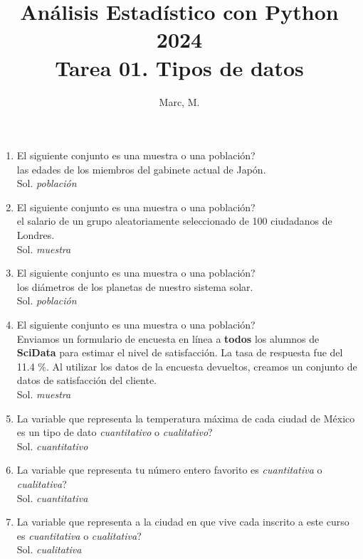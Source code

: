 \documentclass[12pt,letterpaper]{article}
\title{Análisis Estadístico con Python 2024 \\ Tarea 01. Tipos de datos}
\author{Marc, M.}
\begin{document}
\maketitle




\begin{enumerate}
  \item El siguiente conjunto es una muestra o una población? \\ 
   \guillemotleft las edades de los miembros del gabinete actual de Japón\guillemotright . \\  
   Sol. \emph{población}
   
  \item El siguiente conjunto es una muestra o una población? \\ 
  \guillemotleft el salario de un grupo aleatoriamente seleccionado de 100 ciudadanos de Londres\guillemotright . \\ 
   Sol. \emph{muestra} 
   
   \item El siguiente conjunto es una muestra o una población? \\ 
  \guillemotleft los diámetros de los planetas de nuestro sistema solar\guillemotright . \\ 
   Sol. \emph{población} 
   
   \item El siguiente conjunto es una muestra o una población? \\ 
  \guillemotleft Enviamos un formulario de encuesta en línea a \textbf{todos} los alumnos de \textbf{SciData} para estimar el nivel de satisfacción. La tasa de respuesta fue del 11.4 \%. Al utilizar los datos de la encuesta devueltos, creamos un conjunto de datos de satisfacción del cliente\guillemotright . \\ 
   Sol. \emph{muestra}
   
   \item La variable que representa la temperatura máxima de cada ciudad de México es un tipo de dato \emph{cuantitativo} o \emph{cualitativo}? \\ 
   Sol. \emph{cuantitativo}
   
   \item La variable que representa tu número entero favorito es \emph{cuantitativa} o \emph{cualitativa}? \\ 
   Sol. \emph{cuantitativa}
   
   \item La variable que representa a la ciudad en que vive cada inscrito a este curso es \emph{cuantitativa} o \emph{cualitativa}? \\ 
   Sol. \emph{cualitativa} 
   

\end{enumerate}
\end{document}

